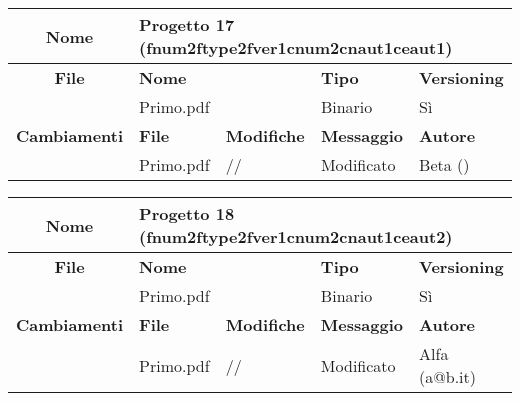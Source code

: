 \begin{table}[ht]
\footnotesize
\begin{tabular}{|c|p{2.5cm}|p{2cm}|p{2.5cm}|p{2.5cm}|}
  \hline
  \textbf{Nome}	& \multicolumn{4}{l|}{Progetto 17 (fnum2ftype2fver1cnum2cnaut1ceaut1)} 									\\
  \hline
  \rowcolor{lightgray}\textbf{File} 		& \multicolumn{2}{l|}{\textbf{Nome}}		& \textbf{Tipo}		& \textbf{Versioning} 		\\
						\cline{2-5}
						& \multicolumn{2}{l|}{Primo.pdf}		& Binario		& Sì				\\
  \hline
  \rowcolor{lightgray}\textbf{Cambiamenti}	& \textbf{File}		&\textbf{Modifiche}	& \textbf{Messaggio}	& \textbf{Autore}		\\
						\cline{2-5}
						& Primo.pdf		& //	 		& Modificato		& Beta ()			\\
						
  \hline
\end{tabular}
\end{table}

\begin{table}[ht]
\footnotesize
\begin{tabular}{|c|p{2.5cm}|p{2cm}|p{2.5cm}|p{2.5cm}|}
  \hline
  \textbf{Nome}	& \multicolumn{4}{l|}{Progetto 18 (fnum2ftype2fver1cnum2cnaut1ceaut2)} 									\\
  \hline
  \rowcolor{lightgray}\textbf{File} 		& \multicolumn{2}{l|}{\textbf{Nome}}		& \textbf{Tipo}		& \textbf{Versioning} 		\\
						\cline{2-5}
						& \multicolumn{2}{l|}{Primo.pdf}		& Binario		& Sì				\\
  \hline
  \rowcolor{lightgray}\textbf{Cambiamenti}	& \textbf{File}		&\textbf{Modifiche}	& \textbf{Messaggio}	& \textbf{Autore}		\\
						\cline{2-5}
						& Primo.pdf		& //	  		& Modificato		& Alfa (a@b.it)			\\
						
  \hline
\end{tabular}
\end{table}

